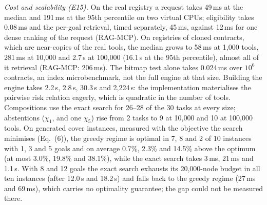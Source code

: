 \emph{Cost and scalability (E15).} On the real registry a request takes 49\,ms at the median and 191\,ms at the
95th percentile on two virtual CPUs; eligibility takes 0.08\,ms and the per-goal retrieval, timed separately,
45\,ms, against 12\,ms for one dense ranking of the request (RAG-MCP). On registries of cloned contracts, which are
near-copies of the real tools, the median grows to 58\,ms at 1,000 tools, 281\,ms at 10,000 and 2.7\,s at 100,000
(16.1\,s at the 95th percentile), almost all of it retrieval (RAG-MCP: 206\,ms). The bitmap test alone takes
0.024\,ms over $10^6$ contracts, an index microbenchmark, not the full engine at that size.
Building the engine takes 2.2\,s, 2.8\,s, 30.3\,s and 2,224\,s: the implementation materialises the pairwise risk
relation eagerly, which is quadratic in the number of tools. Compositions use the exact search for 26--28 of the 30
tasks at every size; abstentions ($\chi_1$, and one $\chi_5$) rise from 2 tasks to 9 at 10,000 and 10 at 100,000
tools. On generated cover instances, measured with the objective the search minimises (Eq.~(6)), the greedy regime
is optimal in 7, 8 and 2 of 10 instances with 1, 3 and 5 goals and on average 0.7\%, 2.3\% and 14.5\% above the
optimum (at most 3.0\%, 19.8\% and 38.1\%), while the exact search takes 3\,ms, 21\,ms and 1.1\,s. With 8 and 12 goals
the exact search exhausts its 20,000-node budget in all ten instances (after 12.0\,s and 18.2\,s) and falls back to
the greedy regime (27\,ms and 69\,ms), which carries no optimality guarantee; the gap could not be measured there.
